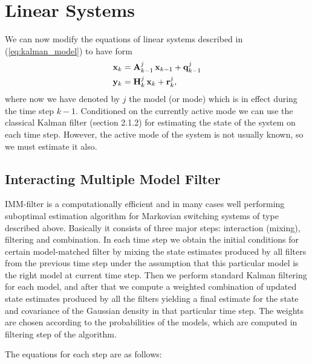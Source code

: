 \section{Linear Systems}

We can now modify the equations of linear systems described in
(\ref{eq:kalman_model}) to have form
%
\begin{equation}
\begin{split} \mathbf{x}_{k} &= \mathbf{A}_{k-1}^j \, \mathbf{x}_{k-1} +
\mathbf{q}_{k-1}^j \\ \mathbf{y}_{k} &= \mathbf{H}_{k}^j \, \mathbf{x}_{k} +
\mathbf{r}_{k}^j,
\end{split}
\label{eq:imm_lin_model}
\end{equation}
%
where now we have denoted by $j$ the model (or mode) which is in
effect during the time step $k-1$. Conditioned on the currently active
mode we can use the classical Kalman filter (section 2.1.2) for
estimating the state of the system on each time step. However, the
active mode of the system is not usually known, so we must estimate it
also.

\subsection{Interacting Multiple Model Filter}

IMM-filter \citep{Bar-Shalom+Li+Kirubarajan:2001} is a computationally efficient
and in many cases well performing suboptimal estimation algorithm for
Markovian switching systems of type described above. Basically it
consists of three major steps: interaction (mixing), filtering and
combination. In each time step we obtain the initial conditions for
certain model-matched filter by mixing the state estimates produced by
all filters from the previous time step under the assumption that this
particular model is the right model at current time step. Then we
perform standard Kalman filtering for each model, and after that we
compute a weighted combination of updated state estimates produced by
all the filters yielding a final estimate for the state and covariance
of the Gaussian density in that particular time step. The weights are
chosen according to the probabilities of the models, which are
computed in filtering step of the algorithm.

The equations for each step are as follows:

